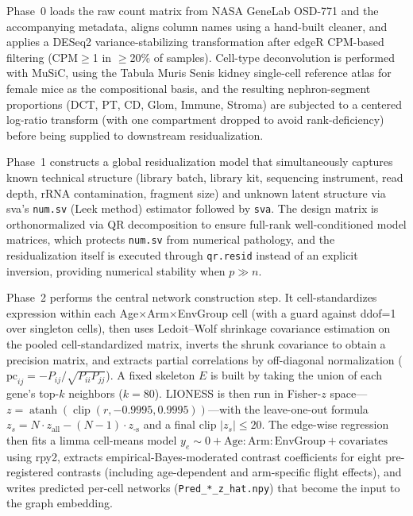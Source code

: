 \documentclass[11pt]{article}
\newcommand{\code}[1]{\texttt{#1}}
\newcommand{\pkg}[1]{\textsf{#1}}
\begin{document}
Phase~0 loads the raw count matrix from NASA GeneLab OSD-771 and the accompanying metadata, aligns column names using a hand-built cleaner, and applies a DESeq2 variance-stabilizing transformation after \pkg{edgeR} CPM-based filtering (CPM$\geq$1 in $\geq$20\% of samples). Cell-type deconvolution is performed with \pkg{MuSiC}, using the Tabula Muris Senis kidney single-cell reference atlas for female mice as the compositional basis, and the resulting nephron-segment proportions (DCT, PT, CD, Glom, Immune, Stroma) are subjected to a centered log-ratio transform (with one compartment dropped to avoid rank-deficiency) before being supplied to downstream residualization.

Phase~1 constructs a global residualization model that simultaneously captures known technical structure (library batch, library kit, sequencing instrument, read depth, rRNA contamination, fragment size) and unknown latent structure via \pkg{sva}'s \code{num.sv} (Leek method) estimator followed by \code{sva}. The design matrix is orthonormalized via QR decomposition to ensure full-rank well-conditioned model matrices, which protects \code{num.sv} from numerical pathology, and the residualization itself is executed through \code{qr.resid} instead of an explicit inversion, providing numerical stability when $p \gg n$.

Phase~2 performs the central network construction step. It cell-standardizes expression within each Age$\times$Arm$\times$EnvGroup cell (with a guard against ddof=1 over singleton cells), then uses Ledoit--Wolf shrinkage covariance estimation on the pooled cell-standardized matrix, inverts the shrunk covariance to obtain a precision matrix, and extracts partial correlations by off-diagonal normalization ($\mathrm{pc}_{ij} = -P_{ij}/\sqrt{P_{ii}P_{jj}}$). A fixed skeleton $E$ is built by taking the union of each gene's top-$k$ neighbors ($k{=}80$). LIONESS is then run in Fisher-$z$ space---$z = \operatorname{atanh}(\operatorname{clip}(r, -0.9995, 0.9995))$---with the leave-one-out formula $z_s = N \cdot z_{\text{all}} - (N-1) \cdot z_{\text{-s}}$ and a final clip $|z_s| \leq 20$. The edge-wise regression then fits a limma cell-means model $y_e \sim 0 + \mathrm{Age}{:}\mathrm{Arm}{:}\mathrm{EnvGroup} + \text{covariates}$ using \pkg{rpy2}, extracts empirical-Bayes-moderated contrast coefficients for eight pre-registered contrasts (including age-dependent and arm-specific flight effects), and writes predicted per-cell networks (\code{Pred\_*\_z\_hat.npy}) that become the input to the graph embedding.
\end{document}
